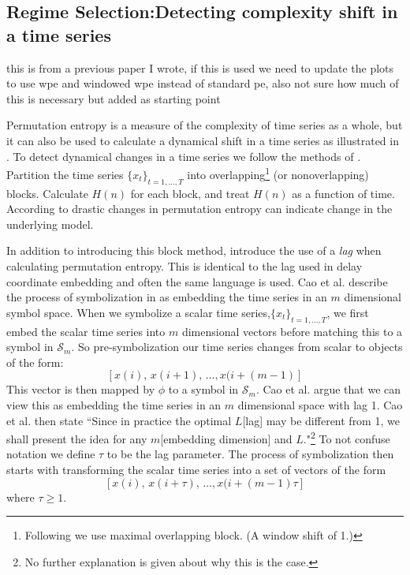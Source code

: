 \subsection{Regime Selection:Detecting complexity shift in a time series}\label{sec:wpeRegime}

{\color{red} this is from a previous paper I wrote, if this is used we need to update the plots to use wpe and windowed wpe instead of standard pe, also not sure how much of this is necessary but added as starting point}

Permutation entropy is a measure of the complexity of time series as a whole, but it can also be used to calculate a dynamical shift in a time series as illustrated in \cite{cao2004det}. To detect dynamical changes in a time series we follow the methods of \cite{cao2004det}. Partition the time series  $\{x_t\}_{t = 1,\dots,T}$ into overlapping\footnote{Following \cite{cao2004det} we use maximal overlapping block. (A window shift of 1.)} (or nonoverlapping) blocks. Calculate $H(n)$ for each block, and treat $H(n)$ as a function of time.  According to \cite{cao2004det} drastic changes in permutation entropy can indicate change in the underlying model.

In addition to introducing this block method, \cite{cao2004det} introduce the use of a \emph{lag} when calculating permutation entropy. This is identical to the lag used in delay coordinate embedding and often the same language is used. Cao et al. describe the process of symbolization in \cite{bandt2002per} as embedding the time series in an $m$ dimensional symbol space. When we symbolize a scalar time series,$\{x_t\}_{t = 1,\dots,T}$, we first embed the scalar time series into $m$ dimensional vectors before matching this to a symbol in $\mathcal{S}_m$. So pre-symbolization our time series changes from scalar to objects of the form:  $$[x(i),\,x(i+1),\,\dots,x(i+(m-1)]$$ This vector is then mapped by $\phi$ to a symbol in $\mathcal{S}_m$. Cao et al. argue that we can view this as embedding the time series in an $m$ dimensional space with lag 1. Cao et al. then state ``Since in practice the optimal $L$[lag] may be different from 1, we shall present the idea for any $m$[embedding dimension] and $L$."\footnote{No further explanation is given about why this is the case.} To not confuse notation we define $\tau$ to be the lag parameter. The process of symbolization then starts with transforming the scalar time series into a set of vectors of the form $$[x(i),\,x(i+\tau),\,\dots,x(i+(m-1)\tau]$$ where $\tau\ge1$.

